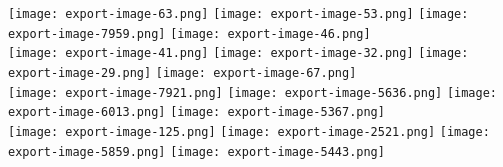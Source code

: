 \documentclass[10pt,twocolumn,letterpaper]{article}
\makeatletter
\def\maxwidth#1{\ifdim\Gin@nat@width>#1 #1\else\Gin@nat@width\fi}
\makeatother
\begin{document}
\begin{figure*}
\centering
\texttt{[image: export-image-63.png]}\hspace{0.1in}
\texttt{[image: export-image-53.png]}\hspace{0.1in}\vspace{0.1in}
\texttt{[image: export-image-7959.png]}\hspace{0.1in}
\texttt{[image: export-image-46.png]}\\ 
\texttt{[image: export-image-41.png]}\hspace{0.1in}
\texttt{[image: export-image-32.png]}\hspace{0.1in}
\texttt{[image: export-image-29.png]}\hspace{0.1in}\vspace{0.1in}
\texttt{[image: export-image-67.png]}\hspace{0.1in}\\
\texttt{[image: export-image-7921.png]}\hspace{0.1in}
\texttt{[image: export-image-5636.png]}\hspace{0.1in}
\texttt{[image: export-image-6013.png]}\hspace{0.1in}\vspace{0.1in}
\texttt{[image: export-image-5367.png]}\\
\texttt{[image: export-image-125.png]}\hspace{0.1in}
\texttt{[image: export-image-2521.png]}\hspace{0.1in}
\texttt{[image: export-image-5859.png]}\hspace{0.1in}\vspace{0.1in}
\texttt{[image: export-image-5443.png]}\\

\end{figure*}
\end{document}
